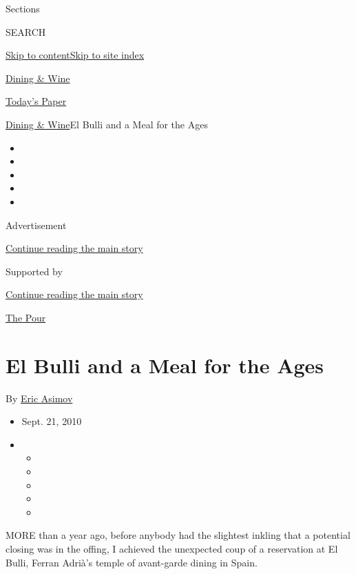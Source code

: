 Sections

SEARCH

\protect\hyperlink{site-content}{Skip to
content}\protect\hyperlink{site-index}{Skip to site index}

\href{https://www.nytimes3xbfgragh.onion/pages/dining/index.html}{Dining
\& Wine}

\href{https://myaccount.nytimes3xbfgragh.onion/auth/login?response_type=cookie\&client_id=vi}{}

\href{https://www.nytimes3xbfgragh.onion/section/todayspaper}{Today's
Paper}

\href{/pages/dining/index.html}{Dining \& Wine}\textbar{}El Bulli and a
Meal for the Ages

\begin{itemize}
\item
\item
\item
\item
\item
\end{itemize}

Advertisement

\protect\hyperlink{after-top}{Continue reading the main story}

Supported by

\protect\hyperlink{after-sponsor}{Continue reading the main story}

\href{/column/the-pour}{The Pour}

\hypertarget{el-bulli-and-a-meal-for-the-ages}{%
\section{El Bulli and a Meal for the
Ages}\label{el-bulli-and-a-meal-for-the-ages}}

By \href{https://www.nytimes3xbfgragh.onion/by/eric-asimov}{Eric Asimov}

\begin{itemize}
\item
  Sept. 21, 2010
\item
  \begin{itemize}
  \item
  \item
  \item
  \item
  \item
  \end{itemize}
\end{itemize}

MORE than a year ago, before anybody had the slightest inkling that a
potential closing was in the offing, I achieved the unexpected coup of a
reservation at El Bulli, Ferran Adrià's temple of avant-garde dining in
Spain.

